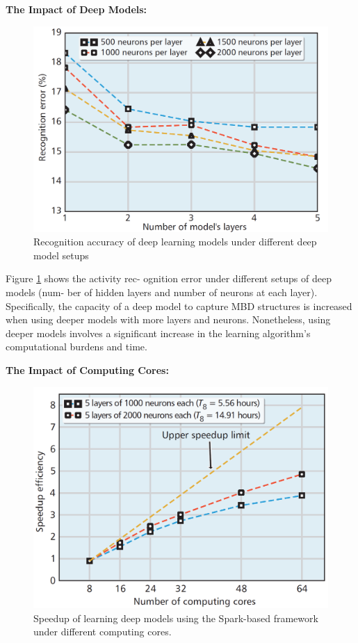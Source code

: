 \documentclass[14pt, a4paper]{extarticle}
\begin{document}
\textbf{The Impact of Deep Models:} 

\begin{figure}[!h]
	\centering
    \includegraphics[width=.8\linewidth]{analysis2.png}
    \caption{Recognition accuracy of deep
learning models under different deep model setups}
	\label{fig:layer}
\end{figure}


Figure \ref{fig:layer} shows the activity rec-
ognition error under different setups of deep models (num-
ber of hidden layers and number of neurons at each layer).
Specifically, the capacity of a deep model to capture MBD
structures is increased when using deeper models with more
layers and neurons. Nonetheless, using deeper models involves
a significant increase in the learning algorithm’s computational
burdens and time. 

\textbf{The Impact of Computing Cores:} 


\begin{figure}[!h]
	\centering
    \includegraphics[width=.8\linewidth]{analysis3.png}
    \caption{Speedup of learning deep models using the Spark-based
framework under different computing cores.}
	\label{fig:core}
\end{figure}
\end{document}

